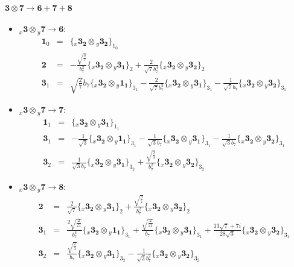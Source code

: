 \documentclass[english]{article}
\newcommand{\rep}[1]{\mathbf{#1}}
\newcommand{\repx}[2]{{}_{#2}\mathbf{#1}}
\newcommand{\subcg}[3]{\big\{ \repx{#1}{x}\otimes\repx{#2}{y}\big\}^{}_{#3}}
\begin{document}
\paragraph*{\Large $\rep{3}\otimes\rep{7}\to\rep{6}+\rep{7}+\rep{8}$}
\begin{itemize}
\item $\repx{3}{x}\otimes\repx{7}{y}\to\rep{6}$:
\begin{eqnarray*}
\rep{1}_{0} &=& \subcg{3_{2}}{3_{2}}{1_{0}}
\\
\rep{2} &=& -\frac{\sqrt{\frac{3}{7}}}{b_7^2}\subcg{3_{2}}{3_{1}}{2}+\frac{2}{\sqrt{7} b_7^4}\subcg{3_{2}}{3_{2}}{2}
\\
\rep{3}_{1} &=& \sqrt{\frac{2}{7}} b_7\subcg{3_{2}}{1_{1}}{3_{1}}-\frac{2}{\sqrt{7} b_7^3}\subcg{3_{2}}{3_{1}}{3_{1}}-\frac{1}{\sqrt{7} b_7}\subcg{3_{2}}{3_{2}}{3_{1}}
\end{eqnarray*}
\item $\repx{3}{x}\otimes\repx{7}{y}\to\rep{7}$:
\begin{eqnarray*}
\rep{1}_{1} &=& \subcg{3_{2}}{3_{1}}{1_{1}}
\\
\rep{3}_{1} &=& -\frac{1}{\sqrt{3}}\subcg{3_{2}}{1_{1}}{3_{1}}-\frac{1}{\sqrt{3} b_7}\subcg{3_{2}}{3_{1}}{3_{1}}-\frac{1}{\sqrt{3} b_7}\subcg{3_{2}}{3_{2}}{3_{1}}
\\
\rep{3}_{2} &=& \frac{1}{\sqrt{3} b_7}\subcg{3_{2}}{3_{1}}{3_{2}}+\frac{\sqrt{\frac{2}{3}}}{b_7^2}\subcg{3_{2}}{3_{2}}{3_{2}}
\end{eqnarray*}
\item $\repx{3}{x}\otimes\repx{7}{y}\to\rep{8}$:
\begin{eqnarray*}
\rep{2} &=& \frac{2}{\sqrt{7}}\subcg{3_{2}}{3_{1}}{2}+\frac{\sqrt{\frac{3}{7}}}{b_7^2}\subcg{3_{2}}{3_{2}}{2}
\\
\rep{3}_{1} &=& \frac{2 \sqrt{\frac{2}{21}}}{b_7^4}\subcg{3_{2}}{1_{1}}{3_{1}}+\frac{\sqrt{\frac{2}{21}}}{b_7}\subcg{3_{2}}{3_{1}}{3_{1}}+\frac{13 \sqrt{7}+7 i}{28 \sqrt{3}}\subcg{3_{2}}{3_{2}}{3_{1}}
\\
\rep{3}_{2} &=& \frac{\sqrt{\frac{2}{3}}}{b_7}\subcg{3_{2}}{3_{1}}{3_{2}}-\frac{1}{\sqrt{3} b_7^2}\subcg{3_{2}}{3_{2}}{3_{2}}
\end{eqnarray*}
\end{itemize}
\end{document}
